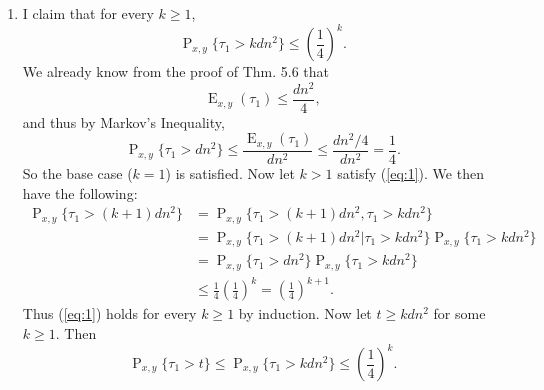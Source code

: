 \documentclass[12pt]{article}
\DeclareMathOperator{\E}{E}
\DeclareMathOperator{\Prob}{P}
\begin{document}
\begin{enumerate}[label=(\alph*)]
\item
I claim that for every $k \geq 1$,
\begin{equation} \label{eq:1}
\Prob_{x, y}\{\tau_1 > kdn^2\} \leq \left(\frac{1}{4}\right)^k.
\end{equation}
We already know from the proof of Thm. 5.6 that
\begin{equation*}
\E_{x, y}(\tau_1) \leq \frac{dn^2}{4},
\end{equation*}
and thus by Markov's Inequality,
\begin{equation*}
\Prob_{x, y}\{\tau_1 > dn^2\} \leq \frac{\E_{x, y}(\tau_1)}{dn^2} \leq \frac{dn^2/4}{dn^2} = \frac{1}{4}.
\end{equation*}
So the base case ($k=1$) is satisfied. Now let $k > 1$ satisfy (\ref{eq:1}). We then have the following:
\begin{align*}
\Prob_{x, y}\{\tau_1 > (k+1)dn^2\} &= \Prob_{x, y}\{\tau_1 > (k+1)dn^2, \tau_1 > kdn^2\} \\
&= \Prob_{x, y}\{\tau_1 > (k+1)dn^2 | \tau_1 > kdn^2\} \Prob_{x, y}\{\tau_1 > kdn^2\} \\
&= \Prob_{x, y}\{\tau_1 > dn^2\} \Prob_{x, y}\{\tau_1 > kdn^2\} \\
&\leq \frac{1}{4}\left(\frac{1}{4}\right)^k = \left(\frac{1}{4}\right)^{k+1}.
\end{align*}
Thus (\ref{eq:1}) holds for every $k \geq 1$ by induction. Now let $t \geq kdn^2$ for some $k \geq 1$. Then
\begin{equation*}
\Prob_{x, y}\{\tau_1 > t\} \leq \Prob_{x, y}\{\tau_1 > kdn^2\} \leq \left(\frac{1}{4}\right)^k.
\end{equation*}


\end{enumerate}
\end{document}
